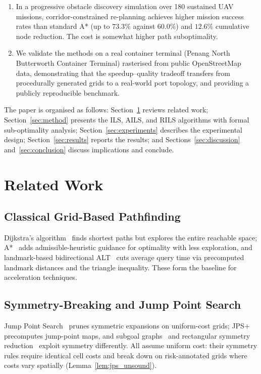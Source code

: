 \documentclass[preprint,12pt,authoryear]{elsarticle}
\begin{document}
\begin{enumerate}
\item In a progressive obstacle discovery simulation over 180 sustained UAV missions, corridor-constrained re-planning achieves higher mission success rates than standard A* (up to $73.3\%$ against $60.0\%$) and $12.6\%$ cumulative node reduction. The cost is somewhat higher path suboptimality.

\item We validate the methods on a real container terminal (Penang North Butterworth Container Terminal) rasterised from public OpenStreetMap data, demonstrating that the speedup--quality tradeoff transfers from procedurally generated grids to a real-world port topology, and providing a publicly reproducible benchmark.
\end{enumerate}

The paper is organised as follows: Section~\ref{sec:related} reviews related work; Section~\ref{sec:method} presents the ILS, AILS, and RILS algorithms with formal sub-optimality analysis; Section~\ref{sec:experiments} describes the experimental design; Section~\ref{sec:results} reports the results; and Sections~\ref{sec:discussion} and~\ref{sec:conclusion} discuss implications and conclude.

\section{Related Work}\label{sec:related}

\subsection{Classical Grid-Based Pathfinding}

Dijkstra's algorithm~\citep{Dijkstra1959} finds shortest paths but explores the entire reachable space; A*~\citep{Hart1968} adds admissible-heuristic guidance for optimality with less exploration, and landmark-based bidirectional ALT~\citep{Goldberg2005} cuts average query time via precomputed landmark distances and the triangle inequality. These form the baseline for acceleration techniques.

\subsection{Symmetry-Breaking and Jump Point Search}

Jump Point Search~\citep{Harabor2011} prunes symmetric expansions on uniform-cost grids; JPS+~\citep{Harabor2014} precomputes jump-point maps, and subgoal graphs~\citep{Uras2013} and rectangular symmetry reduction~\citep{Harabor2014RSR} exploit symmetry differently. All assume uniform cost: their symmetry rules require identical cell costs and break down on risk-annotated grids where costs vary spatially (Lemma~\ref{lem:jps_unsound}).
\end{document}
